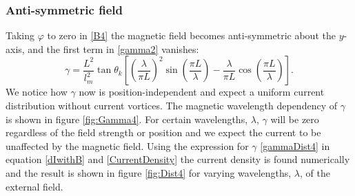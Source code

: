 \subsubsection{Anti-symmetric field}
Taking $\varphi$ to zero in \eqref{B4} the magnetic field becomes anti-symmetric about the $y$-axis, and the first term in \eqref{gamma2} vanishes:
\begin{equation}
\gamma = \frac{L^2}{l_m^2}\tan\theta_k\left[\left(\frac{\lambda}{\pi L}\right)^2\sin\left(\frac{\pi L}{\lambda}\right)-\frac{\lambda}{\pi L}\cos\left(\frac{\pi L}{\lambda}\right)\right].
\label{gammaDist4}
\end{equation}
We notice how $\gamma$ now is position-independent and expect a uniform current distribution without current vortices. The magnetic wavelength dependency of $\gamma$ is shown in figure \ref{fig:Gamma4}. For certain wavelengths, $\lambda$, $\gamma$ will be zero regardless of the field strength or position and we expect the current to be unaffected by the magnetic field. Using the expression for $\gamma$ \eqref{gammaDist4} in equation \eqref{dIwithB} and \eqref{CurrentDensity} the current density is found numerically and the result is shown in figure \ref{fig:Dist4} for varying wavelengths, $\lambda$, of the external field.
